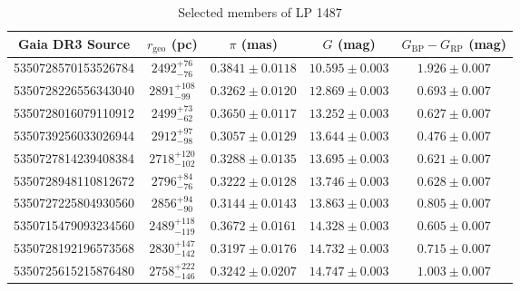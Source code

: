 \begin{table*}[h]
\caption{Selected members of LP 1487}
\label{tab:LP_1487_members}
\begin{tabular}{ccccc}
\hline
Gaia DR3 Source & $r_{\text{geo}}$ (pc) & $\pi$ (mas) & $G$ (mag) & $G_{\text{BP}}-G_{\text{RP}}$ (mag) \\
\hline
5350728570153526784 & $2492^{+76}_{-76}$ & $0.3841\pm0.0118$ & $10.595\pm0.003$ & $1.926\pm0.007$ \\
5350728226556343040 & $2891^{+108}_{-99}$ & $0.3262\pm0.0120$ & $12.869\pm0.003$ & $0.693\pm0.007$ \\
5350728016079110912 & $2499^{+73}_{-62}$ & $0.3650\pm0.0117$ & $13.252\pm0.003$ & $0.627\pm0.007$ \\
5350739256033026944 & $2912^{+97}_{-98}$ & $0.3057\pm0.0129$ & $13.644\pm0.003$ & $0.476\pm0.007$ \\
5350727814239408384 & $2718^{+120}_{-102}$ & $0.3288\pm0.0135$ & $13.695\pm0.003$ & $0.621\pm0.007$ \\
5350728948110812672 & $2796^{+84}_{-76}$ & $0.3222\pm0.0128$ & $13.746\pm0.003$ & $0.628\pm0.007$ \\
5350727225804930560 & $2856^{+94}_{-90}$ & $0.3144\pm0.0143$ & $13.863\pm0.003$ & $0.805\pm0.007$ \\
5350715479093234560 & $2489^{+118}_{-119}$ & $0.3672\pm0.0161$ & $14.328\pm0.003$ & $0.605\pm0.007$ \\
5350728192196573568 & $2830^{+147}_{-142}$ & $0.3197\pm0.0176$ & $14.732\pm0.003$ & $0.715\pm0.007$ \\
5350725615215876480 & $2758^{+222}_{-146}$ & $0.3242\pm0.0207$ & $14.747\pm0.003$ & $1.003\pm0.007$ \\
\hline
\end{tabular}
\end{table*}
